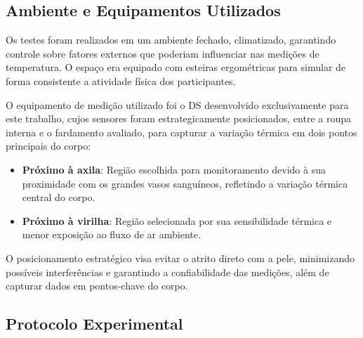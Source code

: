 \subsection{Ambiente e Equipamentos Utilizados}

Os testes foram realizados em um ambiente fechado, climatizado, garantindo controle sobre fatores externos que poderiam influenciar nas medições de temperatura. O espaço era equipado com esteiras ergométricas para simular de forma consistente a atividade física dos participantes.

O equipamento de medição utilizado foi o \acrlong{DS} desenvolvido exclusivamente para este trabalho, cujos sensores foram estrategicamente posicionados, entre a roupa interna e o fardamento avaliado, para capturar a variação térmica em dois pontos principais do corpo:

\begin{itemize}
    \item \textbf{Próximo à axila}: Região escolhida para monitoramento devido à sua proximidade com os grandes vasos sanguíneos, refletindo a variação térmica central do corpo.
    \item \textbf{Próximo à virilha}: Região selecionada por sua sensibilidade térmica e menor exposição ao fluxo de ar ambiente.
\end{itemize}    

O posicionamento estratégico visa evitar o atrito direto com a pele, minimizando possíveis interferências e garantindo a confiabilidade das medições, além de capturar dados em pontos-chave do corpo.

\subsection{Protocolo Experimental}

